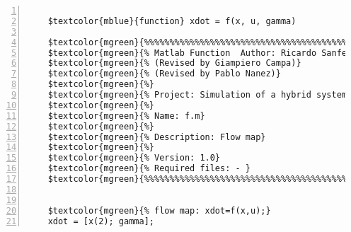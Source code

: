 %  
%  
%  
%  
  
  
\DefineShortVerb[fontfamily=courier,fontseries=m]{\$} 
\DefineShortVerb[fontfamily=courier,fontseries=b]{\#} 
  
\begin{Verbatim}[commandchars=\$\{\},numbers=left,numbersep=2pt] 

    $textcolor{mblue}{function} xdot = f(x, u, gamma) 
     
    $textcolor{mgreen}{%%%%%%%%%%%%%%%%%%%%%%%%%%%%%%%%%%%%%%%%%%%%%%%%%%%%%%%%%%%%%%%%%%%%%%%%%%%} 
    $textcolor{mgreen}{% Matlab Function  Author: Ricardo Sanfelice } 
    $textcolor{mgreen}{% (Revised by Giampiero Campa)} 
    $textcolor{mgreen}{% (Revised by Pablo Nanez)} 
    $textcolor{mgreen}{%} 
    $textcolor{mgreen}{% Project: Simulation of a hybrid system (Bouncing Ball)} 
    $textcolor{mgreen}{%} 
    $textcolor{mgreen}{% Name: f.m} 
    $textcolor{mgreen}{%} 
    $textcolor{mgreen}{% Description: Flow map} 
    $textcolor{mgreen}{%} 
    $textcolor{mgreen}{% Version: 1.0} 
    $textcolor{mgreen}{% Required files: - } 
    $textcolor{mgreen}{%%%%%%%%%%%%%%%%%%%%%%%%%%%%%%%%%%%%%%%%%%%%%%%%%%%%%%%%%%%%%%%%%%%%%%%%%%%} 
     
     
    $textcolor{mgreen}{% flow map: xdot=f(x,u);} 
    xdot = [x(2); gamma];  
\end{Verbatim}  
  
\UndefineShortVerb{\$} 
\UndefineShortVerb{\#} 
 